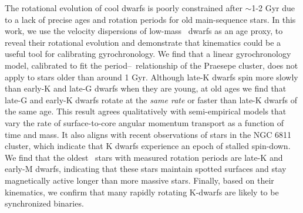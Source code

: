 The rotational evolution of cool dwarfs is poorly constrained after $\sim$1-2
Gyr due to a lack of precise ages and rotation periods for old main-sequence
stars.
In this work, we use the velocity dispersions of low-mass \kepler\ dwarfs as
an age proxy, to reveal their rotational evolution and demonstrate that
kinematics could be a useful tool for calibrating gyrochronology.
We find that a linear gyrochronology model, calibrated to fit the
period--\teff\ relationship of the Praesepe cluster, does not apply to stars
older than around 1 Gyr.
Although late-K dwarfs spin more slowly than early-K and late-G dwarfs when
they are young, at old ages we find that late-G and early-K dwarfs rotate at
the {\it same rate} or faster than late-K dwarfs of the same age.
This result agrees qualitatively with semi-empirical models that vary the rate
of surface-to-core angular momentum transport as a function of time and mass.
It also aligns with recent observations of stars in the NGC 6811 cluster,
which indicate that K dwarfs experience an epoch of stalled spin-down.
We find that the oldest \kepler\ stars with measured rotation periods are
late-K and early-M dwarfs, indicating that these stars maintain spotted
surfaces and stay magnetically active longer than more massive stars.
Finally, based on their kinematics, we confirm that many rapidly rotating
K-dwarfs are likely to be synchronized binaries.
